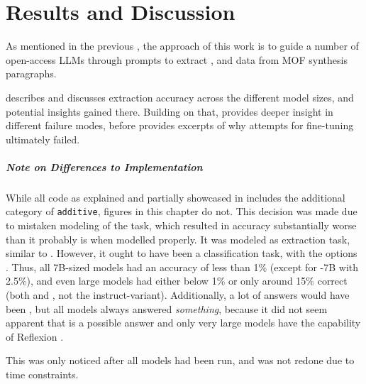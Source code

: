 \chapter{Results and Discussion}\label{chap:results}
As mentioned in the previous , the approach of this work is to guide a number of open-access \glspl{LLM} through prompts to extract \ttemp, \ttime and \tsolv data from \gls{MOF} synthesis paragraphs.

 describes and discusses extraction accuracy across the different model sizes, and potential insights gained there.
Building on that,  provides deeper insight in different failure modes, before  provides excerpts of why attempts for fine-tuning ultimately failed.

\paragraph{Note on Differences to Implementation}
While all code as explained and partially showcased in  includes the additional category of \texttt{additive}, figures in this chapter do not.
This decision was made due to mistaken modeling of the task, which resulted in accuracy substantially worse than it probably is when modelled properly.
It was modeled as extraction task, similar to \tsolv. However, it ought to have been a classification task, with the options .
Thus, all 7B-sized models had an accuracy of less than 1\% (except for -7B with 2.5\%), and even large models had either below 1\% or only around 15\% correct (both  and , not the instruct-variant).
Additionally, a lot of answers would have been , but all models always answered \textit{something}, because it did not seem apparent that  is a possible answer and only very large models have the capability of Reflexion \cite{shinn_reflexion_2023}.

This was only noticed after all models had been run, and was not redone due to time constraints.


